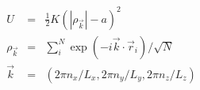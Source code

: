 \documentclass[12pt]{article}
\begin{document}
\begin{eqnarray*}
 U &=&  \frac{1}{2} K (|\rho_{\vec{k}}| - a)^2 \\
 \rho_{\vec{k}} &=& \sum_i^N \exp(-i\vec{k} \cdot \vec{r}_i )/\sqrt{N} \\
 \vec{k} &=& (2\pi n_x /L_x , 2\pi n_y  /L_y , 2\pi n_z/L_z ) 
\end{eqnarray*}
\end{document}
